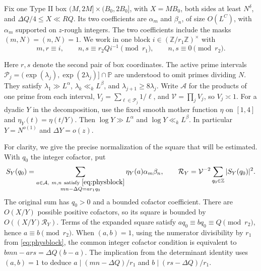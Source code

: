 \documentclass[11pt]{amsart}
\numberwithin{equation}{section}
\theoremstyle{remark}
\begin{document}
Fix one Type II box $(M,2M]\times(B_0,2B_0]$, with
$X=MB_0$, both sides at least $N^\delta$, and
$\Delta Q/4\le X\ll RQ$. Its two coefficients are $\alpha_m$ and
$\beta_n$, of size $O(L^C)$, with $\alpha_m$ supported on $z$-rough
integers. The two coefficients include the masks $(m,N)=(n,N)=1$.
We work in one block $i\in(\mathbb Z/r_1\mathbb Z)^\times$ with
\begin{equation}\label{eq:physblock}
 m,r\equiv i,\qquad n,s\equiv r_2 Q i^{-1}\pmod{r_1},
 \qquad n,s\equiv0\pmod{r_2}.
\end{equation}

Here $r,s$ denote the second pair of box coordinates. The active prime
intervals $\mathcal P_j=(\exp(\lambda_j),\exp(2\lambda_j)]\cap\mathbb P$
are understood to omit primes dividing $N$. They satisfy
$\lambda_1\gg L^\alpha$, $\lambda_k\ll_k L^\beta$, and
$\lambda_{j+1}\ge8\lambda_j$. Write $\mathcal A$ for the products of
one prime from each interval, $V_j=\sum_{\ell\in\mathcal P_j}1/\ell$,
and $\mathcal V=\prod_j V_j$, so $V_j\asymp 1$. For a dyadic $Y$ in the
decomposition, use the fixed smooth mother function $\eta$ on $[1,4]$
and $\eta_Y(t)=\eta(t/Y)$. Then $\log Y\gg L^\alpha$ and
$\log Y\ll_k L^\beta$. In particular $Y=N^{o(1)}$ and $\Delta Y=o(z)$.

For clarity, we give the precise normalization of the square that will
be estimated. With $q_0$ the integer cofactor, put
\[
 S_Y(q_0)=\sum_{\substack{a\in\mathcal A,\ m,n\ \text{satisfy }\eqref{eq:physblock}\\
                          mn-\Delta Q=ar_1q_0}}
       \eta_Y(a)\alpha_m\beta_n,
 \qquad \mathcal R_Y=\mathcal V^{-2}\sum_{q_0\in\mathbb Z}|S_Y(q_0)|^2.
\]
The original sum has $q_0>0$ and a bounded cofactor coefficient. There
are $O(X/Y)$ possible positive cofactors, so its square is bounded by
$O((X/Y)\mathcal R_Y)$. Terms of the expanded square satisfy
$a q_0\equiv b q_0\equiv Q\pmod{r_2}$, hence $a\equiv b\pmod{r_2}$.
When $(a,b)=1$, using the numerator divisibility by $r_1$ from
\eqref{eq:physblock}, the common integer cofactor condition is equivalent to
$bmn-ars=\Delta Q(b-a)$. The implication from the determinant identity
uses $(a,b)=1$ to deduce $a\mid(mn-\Delta Q)/r_1$ and
$b\mid(rs-\Delta Q)/r_1$.
\end{document}

